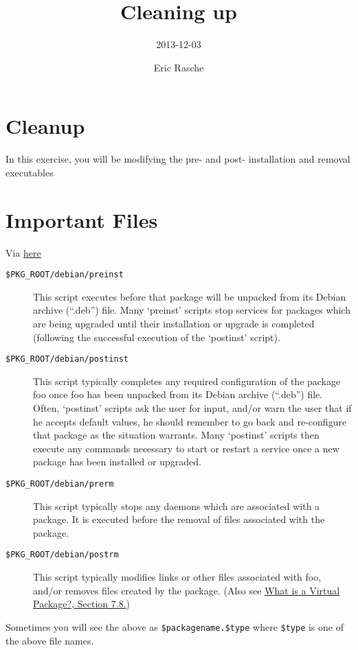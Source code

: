 \documentclass[]{article}
\title{Cleaning up}
\author{2013-12-03}
\date{Eric Rasche}
\begin{document}
\maketitle

\section{Cleanup}

In this exercise, you will be modifying the pre- and post- installation
and removal executables

\section{Important Files}

Via
\href{http://www.debian.org/doc/manuals/debian-faq/ch-pkg\_basics.en.html\#s-maintscripts}{here}

\begin{description}
\item[\texttt{\$PKG\_ROOT/debian/preinst}]
This script executes before that package will be unpacked from its
Debian archive (``.deb'') file. Many `preinst' scripts stop services for
packages which are being upgraded until their installation or upgrade is
completed (following the successful execution of the `postinst' script).

\item[\texttt{\$PKG\_ROOT/debian/postinst}]
This script typically completes any required configuration of the
package foo once foo has been unpacked from its Debian archive
(``.deb'') file. Often, `postinst' scripts ask the user for input,
and/or warn the user that if he accepts default values, he should
remember to go back and re-configure that package as the situation
warrants. Many `postinst' scripts then execute any commands necessary to
start or restart a service once a new package has been installed or
upgraded.

\item[\texttt{\$PKG\_ROOT/debian/prerm}]
This script typically stops any daemons which are associated with a
package. It is executed before the removal of files associated with the
package.

\item[\texttt{\$PKG\_ROOT/debian/postrm}]
This script typically modifies links or other files associated with foo,
and/or removes files created by the package. (Also see
\href{http://www.debian.org/doc/manuals/debian-faq/ch-pkg\_basics.en.html\#s-virtual}{What
is a Virtual Package?, Section 7.8.})

\end{description}
Sometimes you will see the above as \texttt{\$packagename.\$type} where
\texttt{\$type} is one of the above file names.
\end{document}
